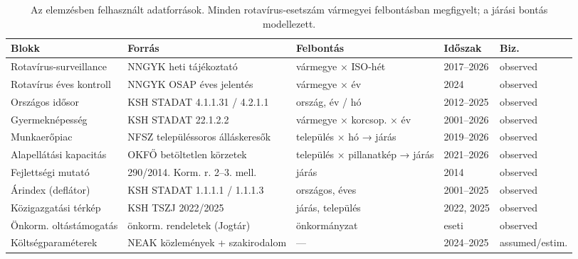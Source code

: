 \begin{table}[htbp]
\centering
\small
\caption{Az elemzésben felhasznált adatforrások. Minden rotavírus-esetszám vármegyei felbontásban megfigyelt; a járási bontás modellezett.}
\label{tab:sources}
\begin{tabular}{p{2.5cm}p{3.7cm}p{4.0cm}p{1.8cm}p{1.6cm}}
\toprule
Blokk & Forrás & Felbontás & Időszak & Biz. \\
\midrule
Rotavírus-surveillance & NNGYK heti tájékoztató & vármegye × ISO-hét & 2017--2026 & observed \\
Rotavírus éves kontroll & NNGYK OSAP éves jelentés & vármegye × év & 2024 & observed \\
Országos idősor & KSH STADAT 4.1.1.31 / 4.2.1.1 & ország, év / hó & 2012--2025 & observed \\
Gyermeknépesség & KSH STADAT 22.1.2.2 & vármegye × korcsop. × év & 2001--2026 & observed \\
Munkaerőpiac & NFSZ településsoros álláskeresők & település × hó → járás & 2019--2026 & observed \\
Alapellátási kapacitás & OKFŐ betöltetlen körzetek & település × pillanatkép → járás & 2021--2026 & observed \\
Fejlettségi mutató & 290/2014. Korm. r. 2--3. mell. & járás & 2014 & observed \\
Árindex (deflátor) & KSH STADAT 1.1.1.1 / 1.1.1.3 & országos, éves & 2001--2025 & observed \\
Közigazgatási térkép & KSH TSZJ 2022/2025 & járás, település & 2022, 2025 & observed \\
Önkorm. oltástámogatás & önkorm. rendeletek (Jogtár) & önkormányzat & eseti & observed \\
Költségparaméterek & NEAK közlemények + szakirodalom & — & 2024--2025 & assumed/estim. \\
\bottomrule
\end{tabular}
\end{table}
